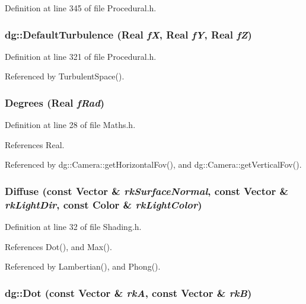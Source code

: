 Definition at line 345 of file Procedural.h.
\subsubsection{ dg::Default\-Turbulence ({\bf Real} {\em f\-X}, {\bf Real} {\em f\-Y}, {\bf Real} {\em f\-Z})\hspace{0.3cm}{\tt  [inline]}}\label{namespacedg_a139}




Definition at line 321 of file Procedural.h.

Referenced by Turbulent\-Space().
\subsubsection{ Degrees ({\bf Real} {\em f\-Rad})\hspace{0.3cm}{\tt  [inline]}}\label{namespacedg_a89}




Definition at line 28 of file Maths.h.

References Real.

Referenced by dg::Camera::get\-Horizontal\-Fov(), and dg::Camera::get\-Vertical\-Fov().
\subsubsection{ Diffuse (const {\bf Vector} \& {\em rk\-Surface\-Normal}, const {\bf Vector} \& {\em rk\-Light\-Dir}, const {\bf Color} \& {\em rk\-Light\-Color})\hspace{0.3cm}{\tt  [inline]}}\label{namespacedg_a173}




Definition at line 32 of file Shading.h.

References Dot(), and Max().

Referenced by Lambertian(), and Phong().
\subsubsection{ dg::Dot (const {\bf Vector} \& {\em rk\-A}, const {\bf Vector} \& {\em rk\-B})}\label{namespacedg_a182}




